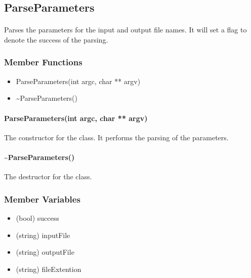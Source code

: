\hypertarget{fileconversion_parseparameters}
{
    \label{fileconversion_parseparameters}
}

\subsection{ParseParameters}
    \paragraph{}
        Parses the parameters for the input and output file names.  It will set a flag to denote the success of the parsing.

    \subsubsection{Member Functions}

        \begin{itemize}
            \item ParseParameters(int argc, char ** argv)
            \item \textasciitilde ParseParameters()
        \end{itemize}

        \paragraph{ParseParameters(int argc, char ** argv)}
            \hfill \break
            The constructor for the class.  It performs the parsing of the parameters.   
        
        \paragraph{\textasciitilde ParseParameters()}
            \hfill \break
            The destructor for the class.

    \subsubsection{Member Variables}
        
        \begin{itemize}
            \item (bool) success
            \item (string) inputFile
            \item (string) outputFile
            \item (string) fileExtention
        \end{itemize}

